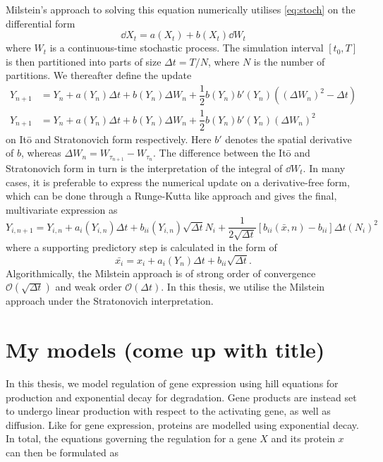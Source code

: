 Milstein's approach to solving this equation numerically utilises
\cref{eq:stoch} on the differential form 
\begin{equation}
  \dd X_t = a(X_t) + b(X_t) \dd W_t
  \label{eq:milstein_form}
\end{equation}
where $W_t$ is a continuous-time stochastic process. The simulation interval
$\left[ t_0, T \right]$is then partitioned into parts of size $\Delta t = T /
N$, where $N$ is the number of partitions. We thereafter define the update
\begin{align}
  Y_{n+1} &= Y_n + 
  a(Y_n)\Delta t + 
  b(Y_n)\Delta W_n +
  \dfrac{1}{2}b(Y_n)b'(Y_n)\left( \left( \Delta W_n \right)^2 - \Delta t \right) \\
  Y_{n+1} &= Y_n + 
  a(Y_n)\Delta t + 
  b(Y_n)\Delta W_n + 
  \dfrac{1}{2} b(Y_n)b'(Y_n) \left(\Delta W_n\right)^2 
  \label{eq:milstein_deriv}
\end{align}
on It\={o} and Stratonovich form respectively. Here $b'$ denotes the spatial
derivative of $b$, whereas $\Delta W_n = W_{\tau_{n+1}} - W_{\tau_n}$. The
difference between the It\={o} and Stratonovich form in turn is the
interpretation of the integral of $\dd W_t$. \CITE In many cases, it is
preferable to express the numerical update on a derivative-free form, which can
be done through a Runge-Kutta like approach \CITE and gives the final,
multivariate expression as 
\begin{equation}
  Y_{i, n+1} = Y_{i, n} + a_i\left( Y_{i,n} \right) \Delta t + 
  b_{ii}(Y_{i,n}) \sqrt{\Delta t} N_i + \dfrac{1}{2\sqrt{\Delta t}} \left[
    b_{ii}(\bar x, n) - b_{ii} \right]
  \Delta t (N_i)^2 
  \label{eq:milstein_deriv_free}
\end{equation}
where a supporting predictory step is calculated in the form of 
\begin{equation}
  \bar {x_i} = x_i + a_i\left( Y_n \right)\Delta t + b_{ii}\sqrt {\Delta t}.
  \label{eq:milstein_predictor}
\end{equation}
Algorithmically, the Milstein approach is of strong order of convergence
$\mathcal O \left( \sqrt{\Delta t }\right)$ and weak order $\mathcal O \left(
  \Delta t \right)$. In this thesis, we utilise the Milstein approach under the
Stratonovich interpretation.


\section{My models (come up with title)}
In this thesis, we model regulation of gene expression using hill equations for
production and exponential decay for degradation. Gene products are instead
set to undergo linear production with respect to the activating gene, as well as
diffusion. Like for gene expression, proteins are modelled using exponential
decay. In total, the equations governing the regulation for a gene $X$ and its
protein $x$ can then be formulated as

